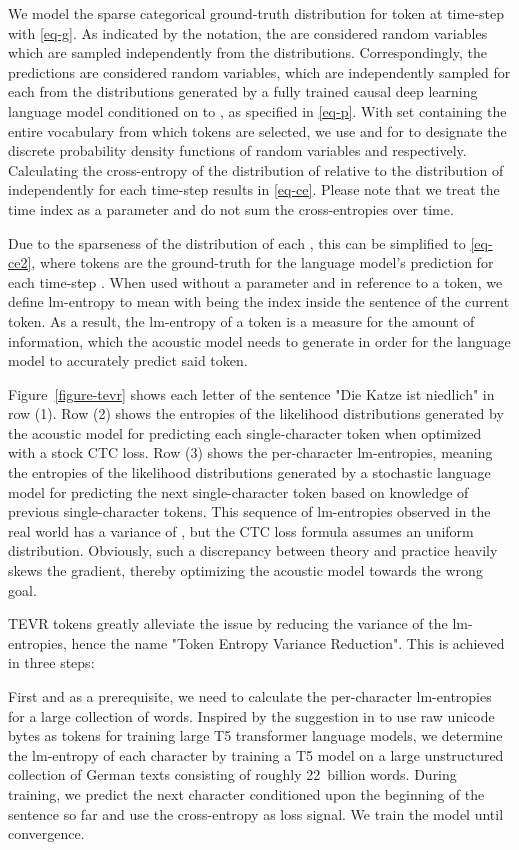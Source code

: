 \documentclass{article} \usepackage{iclr2022_conference,times}
\begin{document}
We model the sparse categorical ground-truth distribution for token  at time-step  with \autoref{eq-g}. 
As indicated by the  notation, the  are considered random variables which are sampled independently from the  distributions.
Correspondingly, the predictions  are considered random variables, which are independently sampled for each  from the distributions generated by a fully trained causal deep learning language model  conditioned on  to , as specified in \autoref{eq-p}.
With set  containing the entire vocabulary from which tokens are selected, we use  and  for  to designate the discrete probability density functions of random variables  and  respectively.
Calculating the cross-entropy of the distribution of  relative to the distribution of  independently for each time-step  results in \autoref{eq-ce}. Please note that we treat the time index  as a parameter and do not sum the cross-entropies over time.

Due to the sparseness of the distribution of each , this can be simplified to \autoref{eq-ce2}, where tokens  are the ground-truth for the language model's prediction for each time-step .
When used without a parameter and in reference to a token, we define lm-entropy to mean  with  being the index inside the sentence of the current token.
As a result, the lm-entropy of a token is a measure for the amount of information, which the acoustic model needs to generate in order for the language model to accurately predict said token.

Figure~\ref{figure-tevr} shows each letter of the sentence "Die Katze ist niedlich" in row (1). 
Row (2) shows the entropies of the likelihood distributions generated by the acoustic model for predicting each single-character token when optimized with a stock CTC loss. 
Row (3) shows the per-character lm-entropies, meaning the entropies of the likelihood distributions generated by a stochastic language model for predicting the next single-character token based on knowledge of previous single-character tokens. 
This sequence of lm-entropies observed in the real world has a variance of ,
but the CTC loss formula assumes an uniform distribution. 
Obviously, such a discrepancy between theory and practice heavily skews the gradient, thereby optimizing the acoustic model towards the wrong goal.

TEVR tokens greatly alleviate the issue by reducing the variance of the lm-entropies, hence the name "Token Entropy Variance Reduction". This is achieved in three steps:

First and as a prerequisite, we need to calculate the per-character lm-entropies for a large collection of words. Inspired by the suggestion in \citet{byt5} to use raw unicode bytes as tokens for training large T5 \citep{origt5} transformer language models, we determine the lm-entropy of each character by training a T5 model on a large unstructured collection of German texts consisting of roughly 22~billion words. During training, we predict the next character conditioned upon the beginning of the sentence so far and use the cross-entropy as loss signal. We train the model until convergence.
\end{document}
